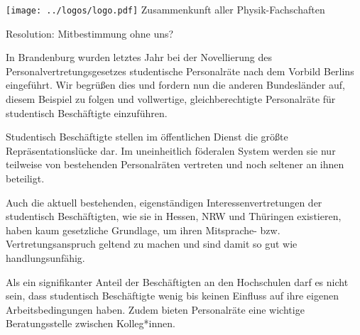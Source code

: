 \documentclass[DIV=calc]{scrartcl}
\begin{document}
\hspace{0.87\textwidth}
\begin{minipage}{120pt}
	\vspace{-1.8cm}
	\texttt{[image: ../logos/logo.pdf]}
	\centering
	\small Zusammenkunft aller Physik-Fachschaften
\end{minipage}

\begin{center}
  \huge{Resolution: Mitbestimmung ohne uns?}
  \vspace{.25\baselineskip}
  \normalsize
\end{center}
\vspace{1cm}







In Brandenburg wurden letztes Jahr bei der Novellierung des
Personalvertretungsgesetzes studentische Personalräte nach dem Vorbild Berlins eingeführt. Wir begrüßen dies und fordern nun die anderen Bundesländer auf, diesem Beispiel zu folgen und vollwertige, gleichberechtigte Personalräte für studentisch Beschäftigte einzuführen.

Studentisch Beschäftigte stellen im öffentlichen Dienst die größte Repräsentationslücke dar. Im uneinheitlich föderalen System werden sie nur teilweise von bestehenden Personalräten vertreten und noch seltener an ihnen beteiligt.

Auch die aktuell bestehenden, eigenständigen Interessenvertretungen der studentisch Beschäftigten, wie sie in Hessen, NRW und Thüringen existieren, haben kaum gesetzliche Grundlage, um ihren Mitsprache- bzw. Vertretungsanspruch geltend zu machen und sind damit so gut wie handlungsunfähig.

Als ein signifikanter Anteil der Beschäftigten an den Hochschulen darf es nicht sein, dass studentisch Beschäftigte wenig bis keinen Einfluss auf ihre eigenen Arbeitsbedingungen haben. Zudem bieten Personalräte eine wichtige Beratungsstelle zwischen Kolleg*innen.
\end{document}
